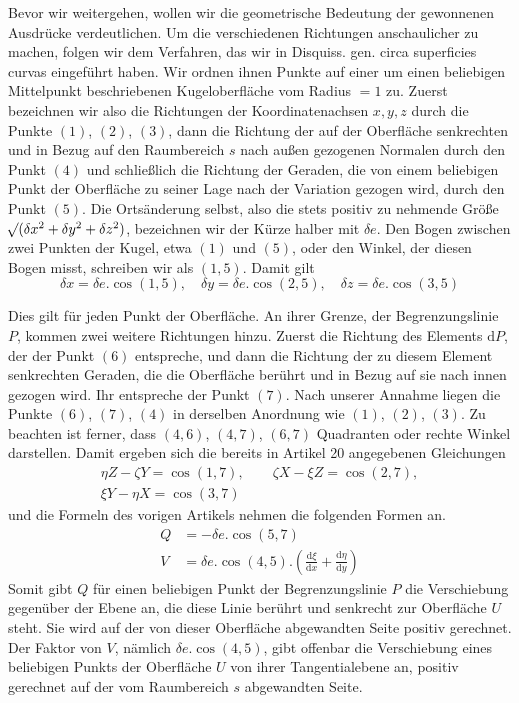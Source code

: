 Bevor wir weitergehen, wollen wir die geometrische Bedeutung der gewonnenen Ausdrücke verdeutlichen. Um die verschiedenen Richtungen anschaulicher zu machen, folgen wir dem Verfahren, das wir in Disquiss. gen. circa superficies curvas eingeführt haben. Wir ordnen ihnen Punkte auf einer um einen beliebigen Mittelpunkt beschriebenen Kugeloberfläche vom Radius $=1$ zu. Zuerst bezeichnen wir also die Richtungen der Koordinatenachsen $x,y,z$ durch die Punkte $(1)$, $(2)$, $(3)$, dann die Richtung der auf der Oberfläche senkrechten und in Bezug auf den Raumbereich $s$ nach außen gezogenen Normalen durch den Punkt $(4)$ und schließlich die Richtung der Geraden, die von einem beliebigen Punkt der Oberfläche zu seiner Lage nach der Variation gezogen wird, durch den Punkt $(5)$. Die Ortsänderung selbst, also die stets positiv zu nehmende Größe $\mathord{{}^{}\!\surd}(\delta x^2+\delta y^2+\delta z^2)$, bezeichnen wir der Kürze halber mit $\delta e$. Den Bogen zwischen zwei Punkten der Kugel, etwa $(1)$ und $(5)$, oder den Winkel, der diesen Bogen misst, schreiben wir als $(1,5)$. Damit gilt
\[
\delta x=\delta e.\cos(1,5),\quad \delta y=\delta e.\cos(2,5),\quad \delta z=\delta e.\cos(3,5)
\]

Dies gilt für jeden Punkt der Oberfläche. An ihrer Grenze, der Begrenzungslinie $P$, kommen zwei weitere Richtungen hinzu. Zuerst die Richtung des Elements $\mathrm{d}P$, der der
Punkt $(6)$ entspreche, und dann die Richtung der zu diesem Element senkrechten Geraden, die die Oberfläche berührt und in Bezug auf sie nach innen gezogen wird. Ihr entspreche der Punkt $(7)$. Nach unserer Annahme liegen die Punkte $(6)$, $(7)$, $(4)$ in derselben Anordnung wie $(1)$, $(2)$, $(3)$. Zu beachten ist ferner, dass $(4,6)$, $(4,7)$, $(6,7)$ Quadranten oder rechte Winkel darstellen. Damit ergeben sich die bereits in Artikel 20 angegebenen Gleichungen
\[
\begin{gathered}
\eta Z-\zeta Y=\cos(1,7),\qquad \zeta X-\xi Z=\cos(2,7),\\
\xi Y-\eta X=\cos(3,7)
\end{gathered}
\]
und die Formeln des vorigen Artikels nehmen die folgenden Formen an.
\[
\begin{aligned}
Q&=-\delta e.\cos(5,7)\\
V&=\delta e.\cos(4,5).(\frac{\mathrm{d}\xi}{\mathrm{d}x}+\frac{\mathrm{d}\eta}{\mathrm{d}y})
\end{aligned}
\]
Somit gibt $Q$ für einen beliebigen Punkt der Begrenzungslinie $P$ die Verschiebung gegenüber der Ebene an, die diese Linie berührt und senkrecht zur Oberfläche $U$ steht. Sie wird auf der von dieser Oberfläche abgewandten Seite positiv gerechnet. Der Faktor von $V$, nämlich $\delta e.\cos(4,5)$, gibt offenbar die Verschiebung eines beliebigen Punkts der Oberfläche $U$ von ihrer Tangentialebene an, positiv gerechnet auf der vom Raumbereich $s$ abgewandten Seite.

